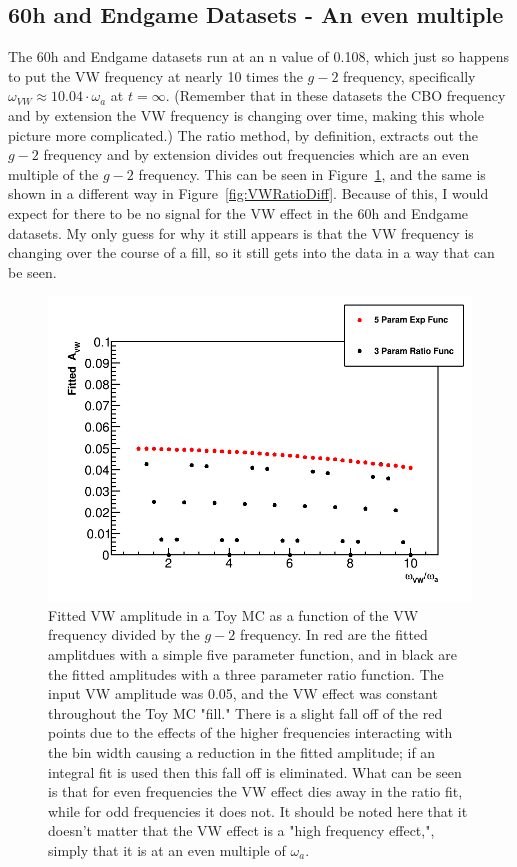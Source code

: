 \documentclass[12pt,letterpaper]{article}
\newcommand{\figref}[1]{Figure~\ref{#1}}
\def\gmtwo{$g-2$\xspace}
\def\wa{$\omega_{a}$\xspace}
\begin{document}
\subsection*{60h and Endgame Datasets - An even multiple}

The 60h and Endgame datasets run at an n value of 0.108, which just so happens to put the VW frequency at nearly 10 times the \gmtwo frequency, specifically $\omega_{VW} \approx 10.04 \cdot \omega_{a}$ at $t = \infty$. (Remember that in these datasets the CBO frequency and by extension the VW frequency is changing over time, making this whole picture more complicated.) The ratio method, by definition, extracts out the \gmtwo frequency and by extension divides out frequencies which are an even multiple of the \gmtwo frequency. This can be seen in \figref{fig:VW1x-10x}, and the same is shown in a different way in \figref{fig:VWRatioDiff}. Because of this, I would expect for there to be no signal for the VW effect in the 60h and Endgame datasets. My only guess for why it still appears is that the VW frequency is changing over the course of a fill, so it still gets into the data in a way that can be seen. 


\begin{figure}[]
    \centering
    \includegraphics[width=.8\textwidth]{Fitted_Avw_Vs_Wvw_1x-10x}
    \caption[]{Fitted VW amplitude in a Toy MC as a function of the VW frequency divided by the \gmtwo frequency. In red are the fitted amplitdues with a simple five parameter function, and in black are the fitted amplitudes with a three parameter ratio function. The input VW amplitude was 0.05, and the VW effect was constant throughout the Toy MC "fill." There is a slight fall off of the red points due to the effects of the higher frequencies interacting with the bin width causing a reduction in the fitted amplitude; if an integral fit is used then this fall off is eliminated. What can be seen is that for even frequencies the VW effect dies away in the ratio fit, while for odd frequencies it does not. It should be noted here that it doesn't matter that the VW effect is a "high frequency effect,", simply that it is at an even multiple of \wa.}
    \label{fig:VW1x-10x}
\end{figure}
\end{document}
